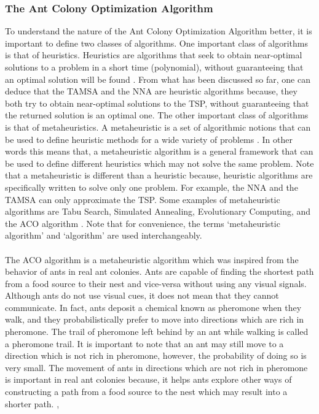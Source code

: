 \documentclass{article}
\begin{document}
\subsubsection{The Ant Colony Optimization Algorithm}
\label{section_ACO}
To understand the nature of the Ant Colony Optimization Algorithm better, it is important to define two classes of algorithms. One important class of algorithms is that of heuristics. Heuristics are algorithms that seek to obtain near-optimal solutions to a problem in a short time (polynomial), without guaranteeing that an optimal solution will be found \cite{dorigo_stutzle_thomas_2004}. From what has been discussed so far, one can deduce that the TAMSA and the NNA are heuristic algorithms because, they both try to obtain near-optimal solutions to the TSP, without guaranteeing that the returned solution is an optimal one. The other important class of algorithms is that of metaheuristics.  A metaheuristic is a set of algorithmic notions that can be used to define heuristic methods for a wide variety of problems \cite{dorigo_stutzle_thomas_2004}. In other words this means that, a metaheuristic algorithm is a general framework that can be used to define different heuristics which may not solve the same problem. Note that a metaheuristic is different than a heuristic because, heuristic algorithms are specifically written to solve only one problem. For example, the NNA and the TAMSA can only approximate the TSP. Some examples of metaheuristic algorithms are Tabu Search, Simulated Annealing, Evolutionary Computing, and the ACO algorithm \cite{dorigo_stutzle_thomas_2004}. Note that for convenience, the terms `metaheuristic algorithm' and `algorithm' are used interchangeably.\\\\
The ACO algorithm is a metaheuristic algorithm which was inspired from the behavior of ants in real ant colonies. Ants are capable of finding the shortest path from a food source to their nest and vice-versa without using any visual signals. Although ants do not use visual cues, it does not mean that they cannot communicate. In fact, ants deposit a chemical known as pheromone when they walk, and they probabilistically prefer to move into directions which are rich in pheromone. The trail of pheromone left behind by an ant while walking is called a pheromone trail. It is important to note that an ant may still move to a direction which is not rich in pheromone, however, the probability of doing so is very small. The movement of ants in directions which are not rich in pheromone is important in real ant colonies because, it helps ants explore other ways of constructing a path from a food source to the nest which may result into a shorter path. \cite{dorigo_gambardella_1997}, \cite{dorigo_stutzle_thomas_2004}\\\\ 
\end{document}
